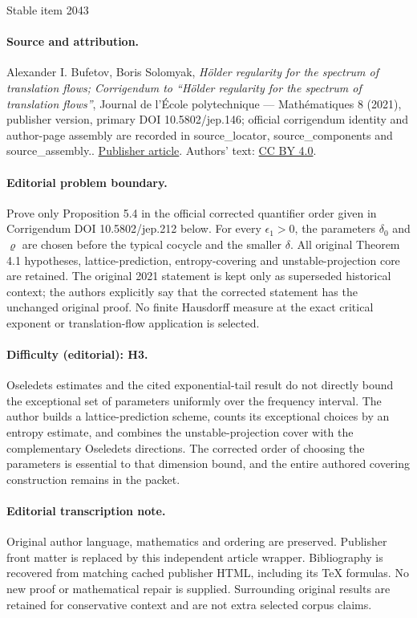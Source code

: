 \documentclass[11pt]{article}
\numberwithin{equation}{section}\newcommand{\Relation}[2][]{}\newtheorem*{prop*}{Proposition}
\begin{document}
\begin{center}{\Large Stable item 2043}\end{center}
\paragraph{Source and attribution.}
Alexander I. Bufetov, Boris Solomyak, \emph{Hölder regularity for the spectrum of translation flows; Corrigendum to “Hölder regularity for the spectrum of translation flows”}, Journal de l’École polytechnique — Mathématiques 8 (2021), publisher version, primary DOI 10.5802/jep.146; official corrigendum identity and author-page assembly are recorded in source\_locator, source\_components and source\_assembly.. \href{https://jep.centre-mersenne.org/articles/10.5802/jep.146/}{Publisher article}. Authors' text: \href{https://creativecommons.org/licenses/by/4.0/}{CC BY 4.0}.
\paragraph{Editorial problem boundary.}
Prove only Proposition 5.4 in the official corrected quantifier order given in Corrigendum DOI 10.5802/jep.212 below. For every \(\epsilon_1>0\), the parameters \(\delta_0\) and \(\varrho\) are chosen before the typical cocycle and the smaller \(\delta\). All original Theorem 4.1 hypotheses, lattice-prediction, entropy-covering and unstable-projection core are retained. The original 2021 statement is kept only as superseded historical context; the authors explicitly say that the corrected statement has the unchanged original proof. No finite Hausdorff measure at the exact critical exponent or translation-flow application is selected.
\paragraph{Difficulty (editorial): H3.}
Oseledets estimates and the cited exponential-tail result do not directly bound the exceptional set of parameters uniformly over the frequency interval. The author builds a lattice-prediction scheme, counts its exceptional choices by an entropy estimate, and combines the unstable-projection cover with the complementary Oseledets directions. The corrected order of choosing the parameters is essential to that dimension bound, and the entire authored covering construction remains in the packet.
\paragraph{Editorial transcription note.}
Original author language, mathematics and ordering are preserved. Publisher front matter is replaced by this independent article wrapper. Bibliography is recovered from matching cached publisher HTML, including its TeX formulas. No new proof or mathematical repair is supplied. Surrounding original results are retained for conservative context and are not extra selected corpus claims.
\clearpage
\end{document}
